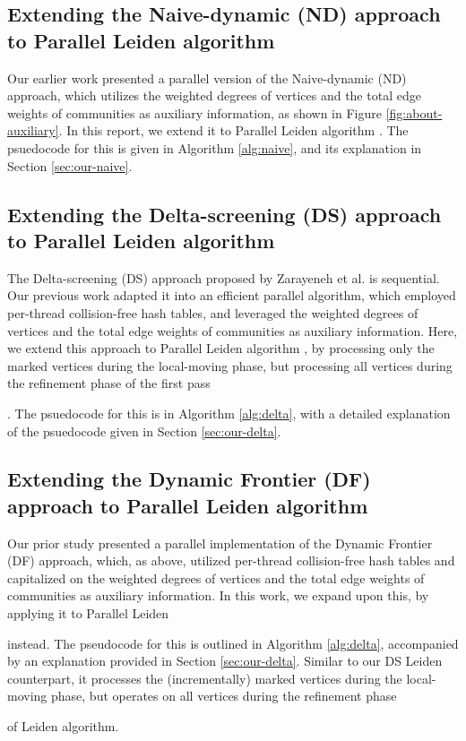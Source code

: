 \subsection{Extending the Naive-dynamic (ND) approach to Parallel Leiden algorithm}

Our earlier work \cite{sahu2024dflouvain} presented a parallel version of the Naive-dynamic (ND) approach, which utilizes the weighted degrees of vertices and the total edge weights of communities as auxiliary information, as shown in Figure \ref{fig:about-auxiliary}. In this report, we extend it to Parallel Leiden algorithm \cite{sahu2023gveleiden}. The psuedocode for this is given in Algorithm \ref{alg:naive}, and its explanation in Section \ref{sec:our-naive}.






\subsection{Extending the Delta-screening (DS) approach to Parallel Leiden algorithm}

The Delta-screening (DS) approach proposed by Zarayeneh et al. \cite{com-zarayeneh21} is sequential. Our previous work \cite{sahu2024dflouvain} adapted it into an efficient parallel algorithm, which employed per-thread collision-free hash tables, and leveraged the weighted degrees of vertices and the total edge weights of communities as auxiliary information. Here, we extend this approach to Parallel Leiden algorithm \cite{sahu2023gveleiden}, by processing only the marked vertices during the local-moving phase, but processing all vertices during the refinement phase of the first pass. The psuedocode for this is in Algorithm \ref{alg:delta}, with a detailed explanation of the psuedocode given in Section \ref{sec:our-delta}.




\subsection{Extending the Dynamic Frontier (DF) approach to Parallel Leiden algorithm}

Our prior study \cite{sahu2024dflouvain} presented a parallel implementation of the Dynamic Frontier (DF) approach, which, as above, utilized per-thread collision-free hash tables and capitalized on the weighted degrees of vertices and the total edge weights of communities as auxiliary information. In this work, we expand upon this, by applying it to Parallel Leiden instead. The pseudocode for this is outlined in Algorithm \ref{alg:delta}, accompanied by an explanation provided in Section \ref{sec:our-delta}. Similar to our DS Leiden counterpart, it processes the (incrementally) marked vertices during the local-moving phase, but operates on all vertices during the refinement phase of Leiden algorithm.



